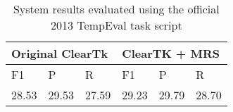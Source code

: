 \documentclass[11pt]{article}
\begin{document}
 \begin{table}[H]
\centering
\caption{System results evaluated using the official 2013 TempEval task script}
\label{my-label}
\begin{tabular}{|l|l|l|l|l|l|}
\hline
\multicolumn{3}{|l|}{Original ClearTk} & \multicolumn{3}{l|}{ClearTK + MRS} \\ \hline
F1            & P             & R             & F1            & P            & R            \\ \hline
28.53         & 29.53         & 27.59         & 29.23         & 29.79        & 28.70        \\ \hline
\end{tabular}
\end{table}
\begin{table*}[t]
\centering
\caption{Classification confusion matrix over the development test data}
\label{my-label}
\end{table*}
\end{document}
